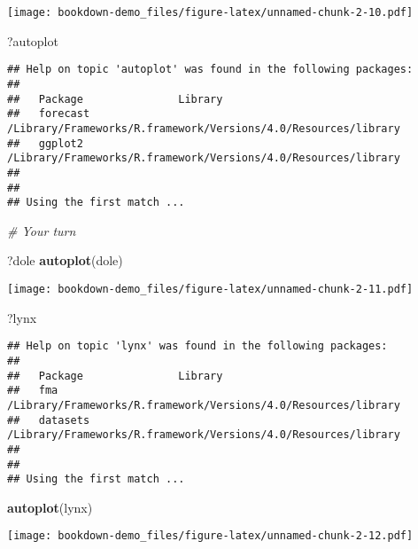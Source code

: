 \documentclass[]{book}
\newenvironment{Shaded}{\begin{snugshade}}{\end{snugshade}}
\newcommand{\CommentTok}[1]{\textcolor[rgb]{0.56,0.35,0.01}{\textit{#1}}}
\newcommand{\KeywordTok}[1]{\textcolor[rgb]{0.13,0.29,0.53}{\textbf{#1}}}
\newcommand{\NormalTok}[1]{#1}
\newcommand{\OperatorTok}[1]{\textcolor[rgb]{0.81,0.36,0.00}{\textbf{#1}}}
\newcommand{\StringTok}[1]{\textcolor[rgb]{0.31,0.60,0.02}{#1}}
\begin{document}
\texttt{[image: bookdown-demo\_files/figure-latex/unnamed-chunk-2-10.pdf]}

\begin{Shaded}
\begin{Highlighting}[]
\NormalTok{  ?autoplot}
\end{Highlighting}
\end{Shaded}

\begin{verbatim}
## Help on topic 'autoplot' was found in the following packages:
## 
##   Package               Library
##   forecast              /Library/Frameworks/R.framework/Versions/4.0/Resources/library
##   ggplot2               /Library/Frameworks/R.framework/Versions/4.0/Resources/library
## 
## 
## Using the first match ...
\end{verbatim}

\begin{Shaded}
\begin{Highlighting}[]
\CommentTok{# Your turn}
  
\NormalTok{  ?dole}
  \KeywordTok{autoplot}\NormalTok{(dole)}
\end{Highlighting}
\end{Shaded}

\texttt{[image: bookdown-demo\_files/figure-latex/unnamed-chunk-2-11.pdf]}

\begin{Shaded}
\begin{Highlighting}[]
\NormalTok{  ?lynx}
\end{Highlighting}
\end{Shaded}

\begin{verbatim}
## Help on topic 'lynx' was found in the following packages:
## 
##   Package               Library
##   fma                   /Library/Frameworks/R.framework/Versions/4.0/Resources/library
##   datasets              /Library/Frameworks/R.framework/Versions/4.0/Resources/library
## 
## 
## Using the first match ...
\end{verbatim}

\begin{Shaded}
\begin{Highlighting}[]
  \KeywordTok{autoplot}\NormalTok{(lynx)}
\end{Highlighting}
\end{Shaded}

\texttt{[image: bookdown-demo\_files/figure-latex/unnamed-chunk-2-12.pdf]}

\begin{Shaded}
\end{Shaded}
\end{document}
